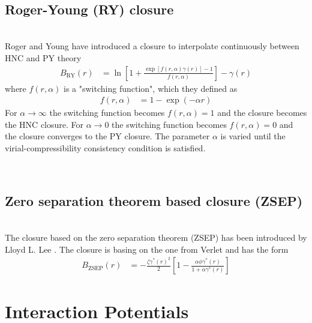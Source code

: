 \vphantom{.}~\\
\subsection{Roger-Young (RY) closure}
~\\

Roger and Young have introduced a closure to interpolate continuously between HNC and PY
theory \cite{Rogers1984}
\begin{align}
B_\text{RY}(r) &= \ln
\left[1+\frac{\exp\left[f(r,\alpha)\gamma(r)\right]-1}{f(r,\alpha)}\right]-\gamma(r)
\end{align}
where $f(r,\alpha)$ is a "switching function", which they defined as
\begin{align}
f(r,\alpha) &= 1- \exp(-\alpha r)
\end{align}
For $\alpha \rightarrow \infty$ the switching function becomes $f(r,\alpha)=1$ and the
closure becomes the HNC closure.
For $\alpha \rightarrow 0$ the switching function becomes $f(r,\alpha)=0$ and the
closure converges to the PY closure. The parameter $\alpha$ is varied until the
virial-compressibility consistency condition is satisfied.

\vphantom{.}~\\
\subsection{Zero separation theorem based closure (ZSEP)}
~\\

The closure based on the zero separation theorem (ZSEP) has been introduced by
Lloyd L. Lee \cite{Lee1995,Lomba1996}. The closure is basing on the one from Verlet \cite{Verlet1980}
and has the form
\begin{align}
B_\text{ZSEP}(r) &= - \frac{\zeta \gamma^*(r)^2}{2}\left[ 1- \frac{\alpha\phi\gamma^*(r)}{1+\alpha\gamma^*(r)}\right]
\end{align}

\section{Interaction Potentials}

